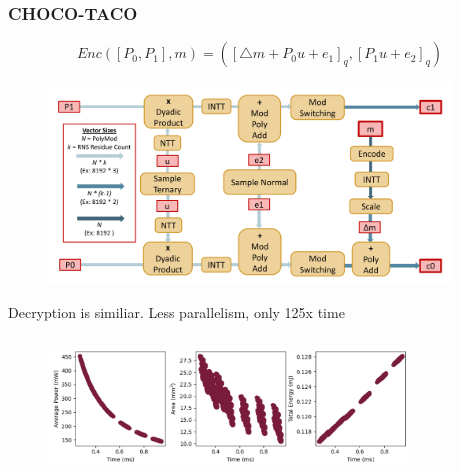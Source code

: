 \documentclass[10pt]{beamer}
\begin{document}
\begin{frame}[noframenumbering]

\frametitle{CHOCO-TACO}
    \vspace{-0.5cm}
\begin{equation*}
    Enc([P_0,P_1],m) = ([\triangle m + P_0u+e_1]_q, [P_1u+e_2]_q)
\end{equation*}
\pause
    \vspace{-1.cm}
\begin{figure}
    \includegraphics[width=0.95\textwidth]{pipeline.png}
\end{figure}
    \vspace{-0.5cm}

Decryption is similiar. Less parallelism, only 125x time




\end{frame}

\begin{frame}[noframenumbering]
\frametitle{}
\begin{figure}
    \includegraphics[width=0.85\textwidth]{design-space.png}
\end{figure}
\end{frame}
\end{document}
